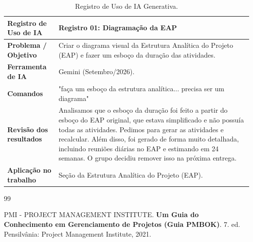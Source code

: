 \documentclass[a4paper]{article}
\begin{document}
\begin{table}[H]
    \centering
    \renewcommand{\arraystretch}{1.5}
    \small 
    \begin{tabular}{|p{4cm}|p{11cm}|}
        \hline
        \textbf{Registro de Uso de IA} & \textbf{Registro 01: Diagramação da EAP} \\
        \hline
        \textbf{Problema / Objetivo} & Criar o diagrama visual da Estrutura Analítica do Projeto (EAP) e fazer um esboço da duração das atividades. \\
        \hline
        \textbf{Ferramenta de IA} & Gemini (Setembro/2026). \\
        \hline
        \textbf{Comandos} & "faça um esboço da estrutura analítica... precisa ser um diagrama" \\
        \hline
        \textbf{Revisão dos resultados} & Analisamos que o esboço da duração foi feito a partir do esboço do EAP original, que estava simplificado e não possuía todas as atividades. Pedimos para gerar as atividades e recalcular. Além disso, foi gerado de forma muito detalhada, incluindo reuniões diárias no EAP e estimando em 24 semanas. O grupo decidiu remover isso na próxima entrega. \\
        \hline
        \textbf{Aplicação no trabalho} & Seção da Estrutura Analítica do Projeto (EAP). \\
        \hline
    \end{tabular}
    \caption{Registro de Uso de IA Generativa.}
    \label{tab:uso_ia}
\end{table}

\begin{thebibliography}{99}

PMI - PROJECT MANAGEMENT INSTITUTE. \textbf{Um Guia do Conhecimento em Gerenciamento de Projetos (Guia PMBOK)}. 7. ed. Pensilvânia: Project Management Institute, 2021.

\end{thebibliography}
\end{document}
